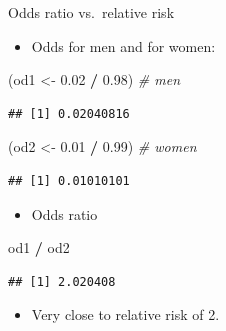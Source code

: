 \documentclass[ignorenonframetext,]{beamer}
\newenvironment{Shaded}{\begin{snugshade}}{\end{snugshade}}
\newcommand{\CommentTok}[1]{\textcolor[rgb]{0.56,0.35,0.01}{\textit{#1}}}
\newcommand{\FloatTok}[1]{\textcolor[rgb]{0.00,0.00,0.81}{#1}}
\newcommand{\NormalTok}[1]{#1}
\newcommand{\OperatorTok}[1]{\textcolor[rgb]{0.81,0.36,0.00}{\textbf{#1}}}
\newcommand{\StringTok}[1]{\textcolor[rgb]{0.31,0.60,0.02}{#1}}
\providecommand{\tightlist}{%
  \setlength{\itemsep}{0pt}\setlength{\parskip}{0pt}}
\begin{document}
\begin{frame}[fragile]{Odds ratio vs.~relative risk}
\protect\hypertarget{odds-ratio-vs.relative-risk}{}

\begin{itemize}
\tightlist
\item
  Odds for men and for women:
\end{itemize}

\begin{Shaded}
\begin{Highlighting}[]
\NormalTok{(od1 <-}\StringTok{ }\FloatTok{0.02} \OperatorTok{/}\StringTok{ }\FloatTok{0.98}\NormalTok{) }\CommentTok{# men}
\end{Highlighting}
\end{Shaded}

\begin{verbatim}
## [1] 0.02040816
\end{verbatim}

\begin{Shaded}
\begin{Highlighting}[]
\NormalTok{(od2 <-}\StringTok{ }\FloatTok{0.01} \OperatorTok{/}\StringTok{ }\FloatTok{0.99}\NormalTok{) }\CommentTok{# women}
\end{Highlighting}
\end{Shaded}

\begin{verbatim}
## [1] 0.01010101
\end{verbatim}

\begin{itemize}
\tightlist
\item
  Odds ratio
\end{itemize}

\begin{Shaded}
\begin{Highlighting}[]
\NormalTok{od1 }\OperatorTok{/}\StringTok{ }\NormalTok{od2}
\end{Highlighting}
\end{Shaded}

\begin{verbatim}
## [1] 2.020408
\end{verbatim}

\begin{itemize}
\tightlist
\item
  Very close to relative risk of 2.
\end{itemize}

\end{frame}
\end{document}
